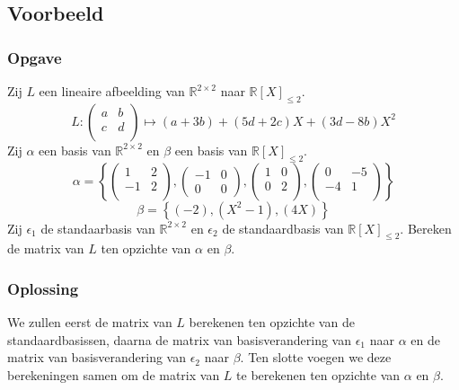 \documentclass[lineaire_algebra_oplossingen.tex]{subfiles}
\begin{document}
\subsection*{Voorbeeld}
\subsubsection*{Opgave}
Zij $L$ een lineaire afbeelding van $\mathbb{R}^{2\times 2}$ naar $\mathbb{R}[X]_{\le 2}$.
\[
L:
\begin{pmatrix}
a & b\\
c & d\\
\end{pmatrix}
\mapsto
(a+3b) + (5d+2c)X + (3d-8b)X^2
\]
Zij $\alpha$ een basis van $\mathbb{R}^{2\times 2}$ en $\beta$ een basis van $\mathbb{R}[X]_{\le 2}$.
\[
\alpha = 
\left\{ 
\begin{pmatrix}
1 & 2\\
-1 & 2\\
\end{pmatrix}
,
\begin{pmatrix}
-1 & 0\\
0 & 0 
\end{pmatrix}
,
\begin{pmatrix}
1 & 0\\
0 & 2\\
\end{pmatrix}
,
\begin{pmatrix}
0 & -5\\
-4 & 1\\
\end{pmatrix}
\right\}
\]
\[
\beta
=
\left\{
(-2) , (X^2-1), (4X)
\right\}
\]
Zij $\epsilon_1$ de standaarbasis van $\mathbb{R}^{2\times 2}$ en $\epsilon_2$ de standaardbasis van $\mathbb{R}[X]_{\le 2}$.
Bereken de matrix van $L$ ten opzichte van $\alpha$ en $\beta$.

\subsubsection*{Oplossing}
We zullen eerst de matrix van $L$ berekenen ten opzichte van de standaardbasissen, daarna de matrix van basisverandering van $\epsilon_1$ naar $\alpha$ en de matrix van basisverandering van $\epsilon_2$ naar $\beta$. Ten slotte voegen we deze berekeningen samen om de matrix van $L$ te berekenen ten opzichte van $\alpha$ en $\beta$.
\end{document}
